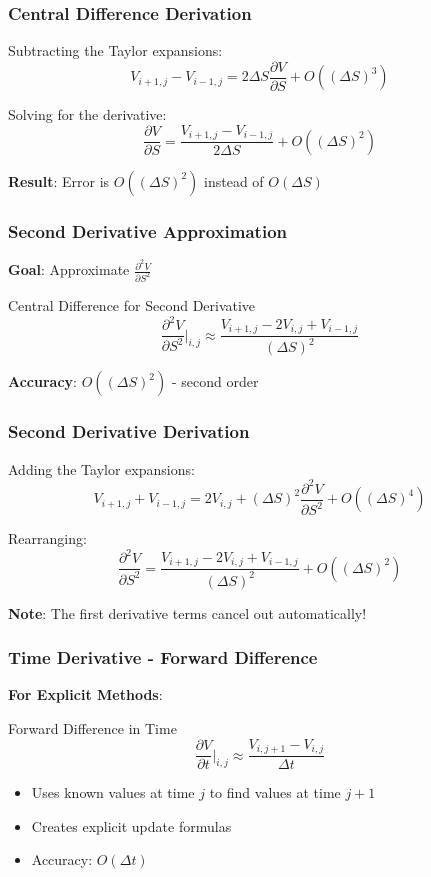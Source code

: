 \documentclass[aspectratio=169]{beamer}
\begin{document}
\begin{frame}
\frametitle{Central Difference Derivation}
Subtracting the Taylor expansions:
\[V_{i+1,j} - V_{i-1,j} = 2\Delta S \frac{\partial V}{\partial S} + O((\Delta S)^3)\]

Solving for the derivative:
\[\frac{\partial V}{\partial S} = \frac{V_{i+1,j} - V_{i-1,j}}{2\Delta S} + O((\Delta S)^2)\]

\textbf{Result}: Error is \(O((\Delta S)^2)\) instead of \(O(\Delta S)\)
\end{frame}

\begin{frame}
\frametitle{Second Derivative Approximation}
\textbf{Goal}: Approximate \(\frac{\partial^2 V}{\partial S^2}\)

\begin{block}{Central Difference for Second Derivative}
\[\frac{\partial^2 V}{\partial S^2} \bigg|_{i,j} \approx \frac{V_{i+1,j} - 2V_{i,j} + V_{i-1,j}}{(\Delta S)^2}\]
\end{block}

\textbf{Accuracy}: \(O((\Delta S)^2)\) - second order
\end{frame}

\begin{frame}
\frametitle{Second Derivative Derivation}
Adding the Taylor expansions:
\[V_{i+1,j} + V_{i-1,j} = 2V_{i,j} + (\Delta S)^2 \frac{\partial^2 V}{\partial S^2} + O((\Delta S)^4)\]

Rearranging:
\[\frac{\partial^2 V}{\partial S^2} = \frac{V_{i+1,j} - 2V_{i,j} + V_{i-1,j}}{(\Delta S)^2} + O((\Delta S)^2)\]

\textbf{Note}: The first derivative terms cancel out automatically!
\end{frame}

\begin{frame}
\frametitle{Time Derivative - Forward Difference}
\textbf{For Explicit Methods}:

\begin{block}{Forward Difference in Time}
\[\frac{\partial V}{\partial t} \bigg|_{i,j} \approx \frac{V_{i,j+1} - V_{i,j}}{\Delta t}\]
\end{block}

\begin{itemize}
\item Uses known values at time \(j\) to find values at time \(j+1\)
\item Creates explicit update formulas
\item Accuracy: \(O(\Delta t)\)
\end{itemize}
\end{frame}
\end{document}

